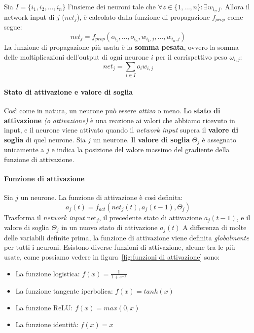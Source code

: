 \documentclass[12pt, twoside, letterpaper]{report}
\begin{document}
			 	Sia $I = \{i_1, i_2, \dots, i_n\}$ l'insieme dei neuroni tale che $\forall z \in \{1, \dots, n\} : \exists w_{i_z,j}$. Allora il network input di $j$ ($net_j$), è calcolato dalla funzione di propagazione $f_{prop}$ come segue: $$net_j = f_{prop}(o_{i_1}, \dots, o_{i_n},w_{i_1,j}, \dots, w_{i_n,j})$$
			 	La funzione di propagazione più usata è la \textbf{somma pesata}, ovvero la somma delle moltiplicazioni dell'output di ogni neurone $i$ per il corrispettivo peso $\omega_{i,j}$: $$net_j = \sum_{i \in I} o_i w_{i,j}$$
			 	
			 \paragraph{Stato di attivazione e valore di soglia} Così come in natura, un neurone può essere \textit{attivo} o meno. Lo \textbf{stato di attivazione} \textit{(o attivazione)} è una reazione ai valori che abbiamo ricevuto in input, e il neurone viene attivato quando il \textit{network input} supera il \textbf{valore di soglia} di quel neurone. Sia $j$ un neurone. Il \textbf{valore di soglia} $\Theta_j$ è assegnato unicamente a $j$ e indica la posizione del valore massimo del gradiente della funzione di attivazione.
			 
			 \paragraph{Funzione di attivazione} Sia $j$ un neurone. La funzione di attivazione è così definita: $$a_j(t) = f_{act}(net_j(t),a_j(t-1), \Theta_j)$$
			 	Trasforma il \textit{network input} net$_j$, il precedente stato di attivazione $a_j(t-1)$, e il valore di soglia $\Theta_j$ in un nuovo stato di attivazione $a_j(t)$ 
			 	A differenza di molte delle variabili definite prima, la funzione di attivazione viene definita \textit{globalmente} per tutti i neuroni. Esistono diverse funzioni di attivazione, alcune tra le più usate, come possiamo vedere in figura~\ref{fig:funzioni di attivazione} sono: 
			 	\begin{itemize}
			 		\item La funzione logistica: $f(x) = \frac{1}{1+e^{-x}}$
			 		\item La funzione tangente iperbolica: $f(x) = tanh(x)$
			 		\item La funzione ReLU: $f(x) = max(0,x)$
			 		\item La funzione identità: $f(x) = x$
			 	\end{itemize}
			 	
\end{document}
